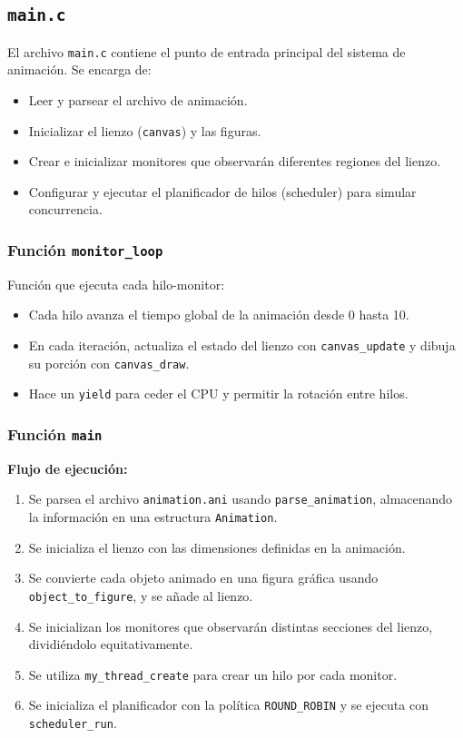 \documentclass[12pt]{article}
\begin{document}
\subsection{\texttt{main.c}}


El archivo \texttt{main.c} contiene el punto de entrada principal del sistema de animación. Se encarga de:
\begin{itemize}
  \item Leer y parsear el archivo de animación.
  \item Inicializar el lienzo (\texttt{canvas}) y las figuras.
  \item Crear e inicializar monitores que observarán diferentes regiones del lienzo.
  \item Configurar y ejecutar el planificador de hilos (scheduler) para simular concurrencia.
\end{itemize}



\subsubsection*{Función \texttt{monitor\_loop}}
Función que ejecuta cada hilo-monitor:
\begin{itemize}
  \item Cada hilo avanza el tiempo global de la animación desde 0 hasta 10.
  \item En cada iteración, actualiza el estado del lienzo con \texttt{canvas\_update} y dibuja su porción con \texttt{canvas\_draw}.
  \item Hace un \texttt{yield} para ceder el CPU y permitir la rotación entre hilos.
\end{itemize}

\subsubsection*{Función \texttt{main}}

\textbf{Flujo de ejecución:}
\begin{enumerate}
  \item Se parsea el archivo \texttt{animation.ani} usando \texttt{parse\_animation}, almacenando la información en una estructura \texttt{Animation}.
  \item Se inicializa el lienzo con las dimensiones definidas en la animación.
  \item Se convierte cada objeto animado en una figura gráfica usando \texttt{object\_to\_figure}, y se añade al lienzo.
  \item Se inicializan los monitores que observarán distintas secciones del lienzo, dividiéndolo equitativamente.
  \item Se utiliza \texttt{my\_thread\_create} para crear un hilo por cada monitor.
  \item Se inicializa el planificador con la política \texttt{ROUND\_ROBIN} y se ejecuta con \texttt{scheduler\_run}.
\end{enumerate}
\end{document}
